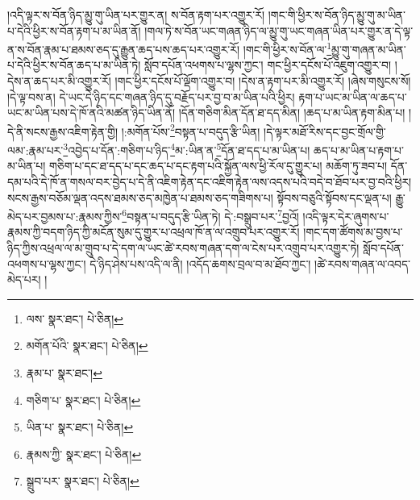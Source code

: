 །འདི་ལྟར་ས་བོན་ཉིད་མྱུ་གུ་ཡིན་པར་གྱུར་ན། ས་བོན་རྟག་པར་འགྱུར་རོ། །གང་གི་ཕྱིར་ས་བོན་ཉིད་མྱུ་གུ་མ་ཡིན་པ་དེའི་ཕྱིར་ས་བོན་རྟག་པ་མ་ཡིན་ནོ། །གལ་ཏེ་ས་བོན་ཡང་གཞན་ཉིད་ལ་མྱུ་གུ་ཡང་གཞན་ཡིན་པར་གྱུར་ན་དེ་ལྟ་ན་ས་བོན་རྣམ་པ་ཐམས་ཅད་དུ་རྒྱུན་ཆད་པས་ཆད་པར་འགྱུར་རོ། །གང་གི་ཕྱིར་ས་བོན་ལ་\footnote{ལས་  སྣར་ཐང་།  པེ་ཅིན། }མྱུ་གུ་གཞན་མ་ཡིན་པ་དེའི་ཕྱིར་ས་བོན་ཆད་པ་མ་ཡིན་ཏེ། སློབ་དཔོན་འཕགས་པ་ལྷས་ཀྱང་། གང་ཕྱིར་དངོས་པོ་འཇུག་འགྱུར་བ། །དེས་ན་ཆད་པར་མི་འགྱུར་རོ། །གང་ཕྱིར་དངོས་པོ་ལྡོག་འགྱུར་བ། །དེས་ན་རྟག་པར་མི་འགྱུར་རོ། །ཞེས་གསུངས་སོ། །དེ་ལྟ་བས་ན། དེ་ཡང་དེ་ཉིད་དང་གཞན་ཉིད་དུ་བརྗོད་པར་བྱ་བ་མ་ཡིན་པའི་ཕྱིར། རྟག་པ་ཡང་མ་ཡིན་ལ་ཆད་པ་ཡང་མ་ཡིན་པས་དེ་ཁོ་ནའི་མཚན་ཉིད་ཡིན་ནོ། །དོན་གཅིག་མིན་དོན་ཐ་དད་མིན། །ཆད་པ་མ་ཡིན་རྟག་མིན་པ། །དེ་ནི་སངས་རྒྱས་འཇིག་རྟེན་གྱི། །:མགོན་པོས་\footnote{མགོན་པོའི་  སྣར་ཐང་།  པེ་ཅིན། }བསྟན་པ་བདུད་རྩི་ཡིན། །དེ་ལྟར་མཐོ་རིས་དང་བྱང་གྲོལ་གྱི་ལམ་:རྣམ་པར་\footnote{རྣམ་པ་  སྣར་ཐང་། }འབྱེད་པ་དོན་:གཅིག་པ་ཉིད་\footnote{གཅིག་པ་  སྣར་ཐང་།  པེ་ཅིན། }མ་:ཡིན་ན་\footnote{ཡིན་པ་  སྣར་ཐང་།  པེ་ཅིན། }དོན་ཐ་དད་པ་མ་ཡིན་པ། ཆད་པ་མ་ཡིན་པ་རྟག་པ་མ་ཡིན་པ། གཅིག་པ་དང་ཐ་དད་པ་དང་ཆད་པ་དང་རྟག་པའི་སྐྱོན་ལས་ཕྱི་རོལ་དུ་གྱུར་པ། མཆོག་ཏུ་ཟབ་པ། དོན་དམ་པའི་དེ་ཁོ་ན་གསལ་བར་བྱེད་པ་དེ་ནི་འཇིག་རྟེན་དང་འཇིག་རྟེན་ལས་འདས་པའི་བདེ་བ་ཐོབ་པར་བྱ་བའི་ཕྱིར། སངས་རྒྱས་བཅོམ་ལྡན་འདས་ཐམས་ཅད་མཁྱེན་པ་ཐམས་ཅད་གཟིགས་པ། སྟོབས་བཅུའི་སྟོབས་དང་ལྡན་པ། རྒྱུ་མེད་པར་བྱམས་པ་:རྣམས་ཀྱིས་\footnote{རྣམས་ཀྱི་  སྣར་ཐང་།  པེ་ཅིན། }བསྟན་པ་བདུད་རྩི་ཡིན་ཏེ། དེ་:བསྒྲུབ་པར་\footnote{སྒྲུབ་པར་  སྣར་ཐང་།  པེ་ཅིན། }བྱའོ། །འདི་ལྟར་དེར་ཞུགས་པ་རྣམས་ཀྱི་བདག་ཉིད་ཀྱི་མངོན་སུམ་དུ་གྱུར་པ་འཕྲལ་ཁོ་ན་ལ་འགྲུབ་པར་འགྱུར་རོ། །གང་དག་ཚོགས་མ་བྱས་པ་ཉིད་ཀྱིས་འཕྲལ་ལ་མ་གྲུབ་པ་དེ་དག་ལ་ཡང་ཚེ་རབས་གཞན་དག་ལ་ངེས་པར་འགྲུབ་པར་འགྱུར་ཏེ། སློབ་དཔོན་འཕགས་པ་ལྷས་ཀྱང་། དེ་ཉིད་ཤེས་པས་འདི་ལ་ནི། །འདོད་ཆགས་བྲལ་བ་མ་ཐོབ་ཀྱང་། །ཚེ་རབས་གཞན་ལ་འབད་མེད་པར། །

